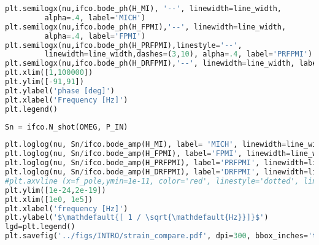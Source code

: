 \begin{lstlisting}[frame=single, language=Python]
plt.semilogx(nu,ifco.bode_ph(H_MI), '--', linewidth=line_width, 
	     alpha=.4, label='MICH')
plt.semilogx(nu,ifco.bode_ph(H_FPMI),'--', linewidth=line_width, 
	     alpha=.4, label='FPMI')
plt.semilogx(nu,ifco.bode_ph(H_PRFPMI),linestyle='--', 
	     linewidth=line_width,dashes=(3,10), alpha=.4, label='PRFPMI')
plt.semilogx(nu,ifco.bode_ph(H_DRFPMI),'--', linewidth=line_width, label='DRFPMI')
plt.xlim([1,100000])
plt.ylim([-91,91])
plt.ylabel('phase [deg]')
plt.xlabel('Frequency [Hz]')
plt.legend()
\end{lstlisting}

\begin{lstlisting}[frame=single, language=Python]
Sn = ifco.N_shot(OMEG, P_IN)
\end{lstlisting}

\begin{lstlisting}[frame=single, language=Python]
plt.loglog(nu, Sn/ifco.bode_amp(H_MI), label= 'MICH', linewidth=line_width)
plt.loglog(nu, Sn/ifco.bode_amp(H_FPMI), label='FPMI', linewidth=line_width)
plt.loglog(nu, Sn/ifco.bode_amp(H_PRFPMI), label='PRFPMI', linewidth=line_width)
plt.loglog(nu, Sn/ifco.bode_amp(H_DRFPMI), label='DRFPMI', linewidth=line_width)
#plt.axvline (x=f_pole,ymin=1e-11, color='red', linestyle='dotted', linewidth=3)
plt.ylim([1e-24,2e-19])
plt.xlim([1e0, 1e5])
plt.xlabel('frequency [Hz]')
plt.ylabel('$\mathdefault{[ 1 / \sqrt{\mathdefault{Hz}}]}$')
lgd=plt.legend()
plt.savefig('../figs/INTRO/strain_compare.pdf', dpi=300, bbox_inches='tight')
\end{lstlisting}

